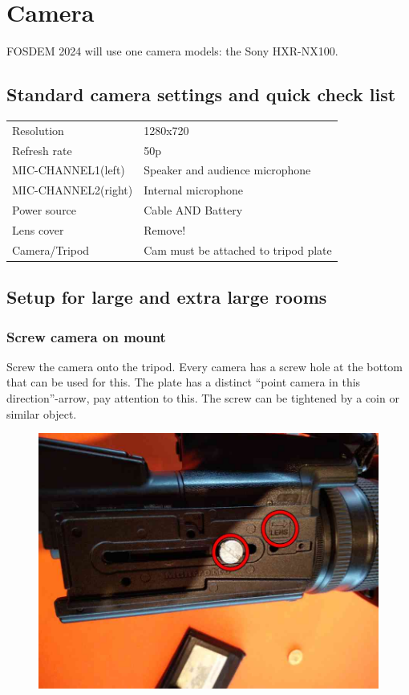 \documentclass{article}
\begin{document}
\section{Camera}
FOSDEM 2024 will use one camera models: the Sony HXR-NX100.

\subsection{Standard camera settings and quick check list}
\begin{tabular}{| l | l |}
Resolution & 1280x720 \\
Refresh rate & 50p \\
MIC-CHANNEL1(left) &  Speaker and audience microphone \\
MIC-CHANNEL2(right) & Internal microphone \\
Power source & Cable AND Battery \\
Lens cover & Remove! \\
Camera/Tripod & Cam must be attached to tripod plate \\
\end{tabular}

\subsection{Setup for large and extra large rooms}

\subsubsection{Screw camera on mount}
Screw the camera onto the tripod. Every camera has a screw hole at the bottom that can be used for this. The plate has a distinct ``point camera in this direction''-arrow, pay attention to this. The screw can be tightened by a coin or similar object.

\begin{figure}[H]
  \centering
  \includegraphics[width = 120mm]{Cam00.jpg}
\end{figure}
\end{document}
